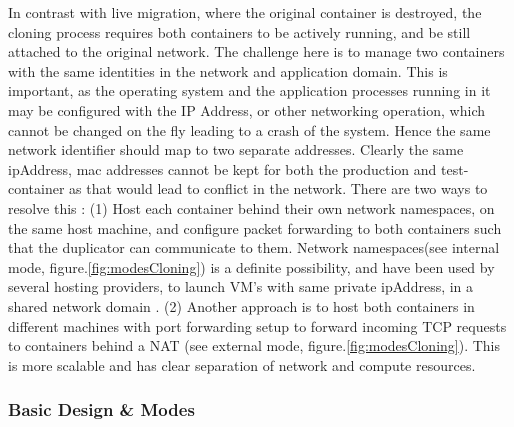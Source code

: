 In contrast with live migration, where the original container is destroyed, the cloning process requires both containers to be actively running, and be still attached to the original network.
The challenge here is to manage two containers with the same identities in the network and application domain. 
This is important, as the operating system and the application processes running in it may be configured with the IP Address, or other networking operation, which cannot be changed on the fly leading to a crash of the system.
Hence the same network identifier should map to two separate addresses.
Clearly the same ipAddress, mac addresses cannot be kept for both the production and test-container as that would lead to conflict in the network. 
There are two ways to resolve this : 
(1) Host each container behind their own network namespaces, on the same host machine, and configure packet forwarding to both containers such that the duplicator can communicate to them. 
Network namespaces(see internal mode, figure.\ref{fig:modesCloning}) is a definite possibility, and have been used by several hosting providers, to launch VM's with same private ipAddress, in a shared network domain \cite{OpenStack}. 
(2) Another approach is to host both containers in different machines with port forwarding setup to forward incoming TCP requests to containers behind a NAT (see external mode, figure.\ref{fig:modesCloning}). 
This is more scalable and has clear separation of network and compute resources. 


\subsubsection{Basic Design \& Modes}

